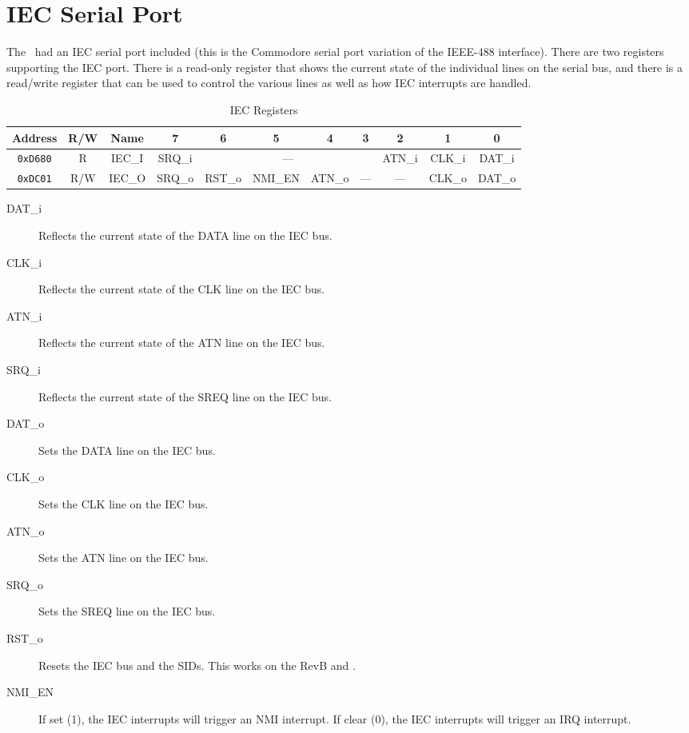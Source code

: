 \chapter{IEC Serial Port}

The \jr\ had an IEC serial port included (this is the Commodore serial port variation of the IEEE-488 interface). There are two registers supporting the IEC port. There is a read-only register that shows the current state of the individual lines on the serial bus, and there is a read/write register that can be used to control the various lines as well as how IEC interrupts are handled.

\begin{table}[h]
    \begin{center}
        \begin{tabular}{|c|c|c|c|c|c|c|c|c|c|c|} \hline
            Address & R/W & Name & 7 & 6 & 5 & 4 & 3 & 2 & 1 & 0 \\\hline\hline
            \verb+0xD680+ & R & IEC\_I & SRQ\_i & \multicolumn{4}{|c|}{---} & ATN\_i & CLK\_i & DAT\_i \\ \hline
            \verb+0xDC01+ & R/W & IEC\_O & SRQ\_o & RST\_o & NMI\_EN & ATN\_o & --- & --- & CLK\_o & DAT\_o \\ \hline
        \end{tabular}
    \end{center}
    \caption{IEC Registers}
    \label{tab:iec_reg}
\end{table}

\begin{description}
    \item[DAT\_i] Reflects the current state of the DATA line on the IEC bus. 
    \item[CLK\_i] Reflects the current state of the CLK line on the IEC bus.
    \item[ATN\_i] Reflects the current state of the ATN line on the IEC bus.
    \item[SRQ\_i] Reflects the current state of the SREQ line on the IEC bus.
    
    \item[DAT\_o] Sets the DATA line on the IEC bus. 
    \item[CLK\_o] Sets the CLK line on the IEC bus.
    \item[ATN\_o] Sets the ATN line on the IEC bus.
    \item[SRQ\_o] Sets the SREQ line on the IEC bus.
    \item[RST\_o] Resets the IEC bus and the SIDs. This works on the RevB and \fk. 
    \item[NMI\_EN] If set (1), the IEC interrupts will trigger an NMI interrupt. If clear (0), the IEC interrupts will trigger an IRQ interrupt.  
\end{description}
